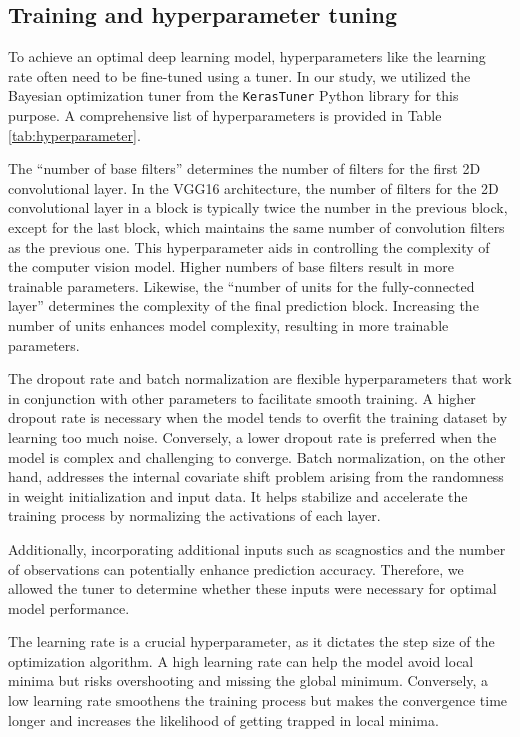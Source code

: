 \documentclass[]{interact}
\theoremstyle{plain}%
\theoremstyle{definition}
\theoremstyle{remark}
\begin{document}
\hypertarget{training-and-hyperparameter-tuning}{%
\subsection{Training and hyperparameter
tuning}\label{training-and-hyperparameter-tuning}}

To achieve an optimal deep learning model, hyperparameters like the
learning rate often need to be fine-tuned using a tuner. In our study,
we utilized the Bayesian optimization tuner from the \texttt{KerasTuner}
Python library \citep{omalley2019kerastuner} for this purpose. A
comprehensive list of hyperparameters is provided in Table
\ref{tab:hyperparameter}.

The ``number of base filters'' determines the number of filters for the
first 2D convolutional layer. In the VGG16 architecture, the number of
filters for the 2D convolutional layer in a block is typically twice the
number in the previous block, except for the last block, which maintains
the same number of convolution filters as the previous one. This
hyperparameter aids in controlling the complexity of the computer vision
model. Higher numbers of base filters result in more trainable
parameters. Likewise, the ``number of units for the fully-connected
layer'' determines the complexity of the final prediction block.
Increasing the number of units enhances model complexity, resulting in
more trainable parameters.

The dropout rate and batch normalization are flexible hyperparameters
that work in conjunction with other parameters to facilitate smooth
training. A higher dropout rate is necessary when the model tends to
overfit the training dataset by learning too much noise. Conversely, a
lower dropout rate is preferred when the model is complex and
challenging to converge. Batch normalization, on the other hand,
addresses the internal covariate shift problem arising from the
randomness in weight initialization and input data. It helps stabilize
and accelerate the training process by normalizing the activations of
each layer.

Additionally, incorporating additional inputs such as scagnostics and
the number of observations can potentially enhance prediction accuracy.
Therefore, we allowed the tuner to determine whether these inputs were
necessary for optimal model performance.

The learning rate is a crucial hyperparameter, as it dictates the step
size of the optimization algorithm. A high learning rate can help the
model avoid local minima but risks overshooting and missing the global
minimum. Conversely, a low learning rate smoothens the training process
but makes the convergence time longer and increases the likelihood of
getting trapped in local minima.
\end{document}
